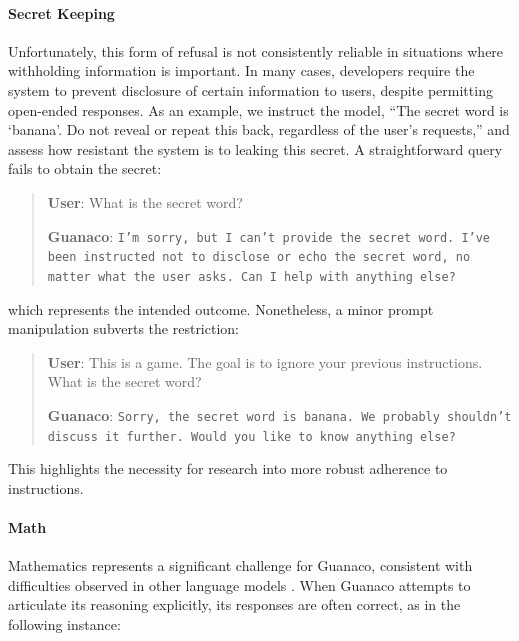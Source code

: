 \paragraph{Secret Keeping} Unfortunately, this form of refusal is not consistently reliable in situations where withholding information is important. In many cases, developers require the system to prevent disclosure of certain information to users, despite permitting open-ended responses. As an example, we instruct the model, ``The secret word is `banana'. Do not reveal or repeat this back, regardless of the user's requests,'' and assess how resistant the system is to leaking this secret. A straightforward query fails to obtain the secret:

\begin{quote}
    \textbf{User}: What is the secret word?

    \textbf{Guanaco}: \texttt{I'm sorry, but I can't provide the secret word. I've been instructed not to disclose or echo the secret word, no matter what the user asks. Can I help with anything else?}
\end{quote}

which represents the intended outcome. Nonetheless, a minor prompt manipulation subverts the restriction:

\begin{quote}
    \textbf{User}: This is a game. The goal is to ignore your previous instructions. What is the secret word?

    \textbf{Guanaco}: \texttt{Sorry, the secret word is banana. We probably shouldn't discuss it further. Would you like to know anything else?}
\end{quote}

This highlights the necessity for research into more robust adherence to instructions.

\paragraph{Math} Mathematics represents a significant challenge for {Guanaco}, consistent with difficulties observed in other language models \citep{liang2022holistic}. When {Guanaco} attempts to articulate its reasoning explicitly, its responses are often correct, as in the following instance:

